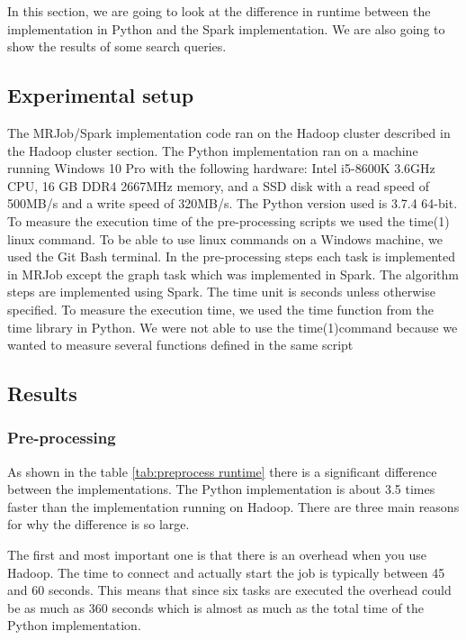 
In this section, we are going to look at the difference in runtime between the implementation in Python and the Spark implementation. We are also going to show the results of some search queries.



\subsection{Experimental setup}

The MRJob/Spark implementation code ran on the Hadoop cluster described in the Hadoop cluster section. The Python implementation ran on a machine running Windows 10 Pro with the following hardware: Intel i5-8600K 3.6GHz CPU, 16 GB DDR4 2667MHz memory, and a SSD disk with a read speed of 500MB/s and a write speed of 320MB/s. The Python version used is 3.7.4 64-bit. To measure the execution time of the pre-processing scripts we used the time(1)\cite{Time1} linux command. To be able to use linux commands on a Windows machine, we used the Git Bash terminal\cite{GitBash}. In the pre-processing steps each task is implemented in MRJob except the graph task which was implemented in Spark. The algorithm steps are implemented using Spark. The time unit is seconds unless otherwise specified. To measure the execution time, we used the time function from the time library in Python. We were not able to use the time(1)command because we wanted to measure several functions defined in the same script



\subsection{Results}

\subsubsection{Pre-processing}

As shown in the table \ref{tab:preprocess runtime} there is a significant difference between the implementations. The Python implementation is about 3.5 times faster than the implementation running on Hadoop. There are three main reasons for why the difference is so large.
 
The first and most important one is that there is an overhead when you use Hadoop. The time to connect and actually start the job is typically between 45 and 60 seconds. This means that since six tasks are executed the overhead could be as much as 360 seconds which is almost as much as the total time of the Python implementation. 

